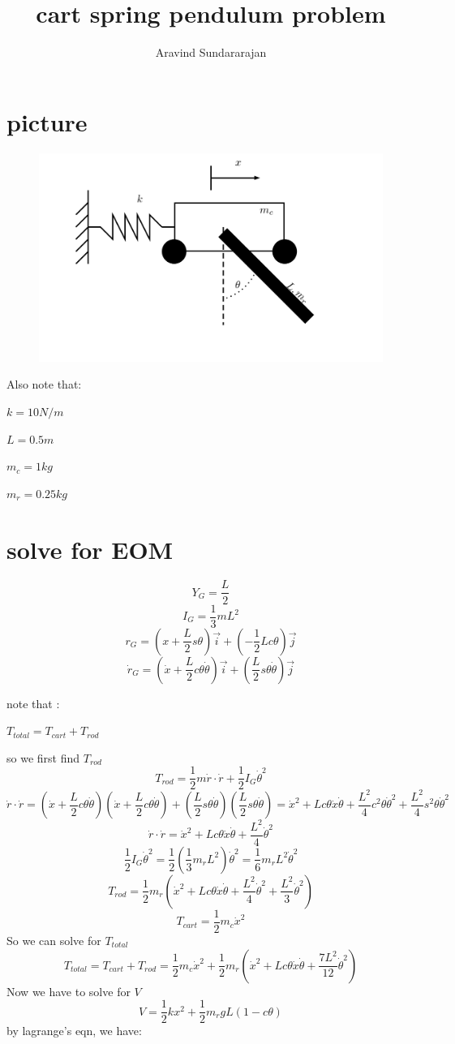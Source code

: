 \documentclass[]{article}
\title{cart spring pendulum problem}
\author{Aravind Sundararajan}
\begin{document}
\maketitle
\section{picture}
\begin{figure}[H]
	\includegraphics[width=.75\linewidth] {cart_problem.png}
\end{figure}
Also note that:

$k = 10 N/m$

$L = 0.5 m$

$m_c = 1 kg$

$m_r = 0.25 kg$

\newpage

\section{solve for EOM}
$$Y_G = \frac{L}{2}$$
$$I_G = \frac{1}{3} m L^2$$
$$r_G = (x + \frac{L}{2} s\theta) \vec{i} + (- \frac{1}{2} L c\theta) \vec{j}$$
$$\dot{r}_G = (\dot{x} + \frac{L}{2} c\theta \dot{\theta}) \vec{i} + (\frac{L}{2} s\theta \dot{\theta}) \vec{j}$$

note that : 

$T_{total} = T_{cart} + T_{rod}$

so we first find $T_{rod}$
$$T_{rod} = \frac{1}{2} m \dot{r} \cdot \dot{r} + \frac{1}{2} I_G \dot{\theta}^2$$
$$ \dot{r} \cdot \dot{r} = (\dot{x} + \frac{L}{2} c\theta \dot{\theta})(\dot{x} + \frac{L}{2} c\theta \dot{\theta}) + (\frac{L}{2} s\theta \dot{\theta})(\frac{L}{2} s\theta \dot{\theta})= \dot{x}^2 + Lc\theta\dot{x}\dot{\theta} + \frac{L^2}{4} c^2\theta \dot{\theta}^2  + \frac{L^2}{4} s^2\theta \dot{\theta}^2$$
$$ \dot{r} \cdot \dot{r} = \dot{x}^2 + Lc\theta\dot{x}\dot{\theta} + \frac{L^2}{4}\dot{\theta}^2$$
$$\frac{1}{2} I_G \dot{\theta}^2 = \frac{1}{2} (\frac{1}{3} m_r L^2) \dot{\theta}^2 = \frac{1}{6} m_r L^2 \dot{\theta}^2$$
$$T_{rod} = \frac{1}{2} m_r (\dot{x}^2 + Lc\theta\dot{x}\dot{\theta} + \frac{L^2}{4}\dot{\theta}^2 + \frac{L^2}{3}  \dot{\theta}^2)$$
$$T_{cart} = \frac{1}{2} m_c \dot{x}^2 $$
So we can solve for $T_{total}$
$$
T_{total} = T_{cart} + T_{rod} =\frac{1}{2} m_c \dot{x}^2 + \frac{1}{2} m_r (\dot{x}^2 + Lc\theta\dot{x}\dot{\theta} + \frac{7 L^2}{12}  \dot{\theta}^2) 
$$
Now we have to solve for $V$
$$V = \frac{1}{2} k x^2 + \frac{1}{2}m_r g L (1-c\theta)  $$
by lagrange's eqn, we have:
\end{document}
